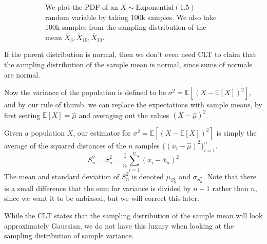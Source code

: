 \documentclass{article}
\begin{document}
\begin{example}
\begin{figure}[H]
\begin{subfigure}[b]{0.48\textwidth}
          \caption{We plot the PDF of an $X \sim \mathrm{Exponential}(1.5)$ random variable by taking 100k samples. We also take 100k samples from the sampling distribution of the mean $\overline{X}_{3}, \overline{X}_{10}, \overline{X}_{30}$. }
          \label{fig:sample_mean_exp}
        \end{subfigure}
        \caption{}
        \label{fig:sample_mean_examples}
      \end{figure}
    \end{example}

    If the parent distribution is normal, then we don't even need CLT to claim that the sampling distribution of the sample mean is normal, since sums of normals are normal. 

    Now the variance of the population is defined to be $\sigma^2 = \mathbb{E}[ (X - \mathbb{E}[X])^2 ]$, and by our rule of thumb, we can replace the expectations with sample means, by first setting $\mathbb{E}[X] = \widehat{\mu}$ and averaging out the values $(X - \widehat{\mu})^2$. 

    \begin{definition}
      Given a population $X$, our estimator for $\sigma^2 = \mathbb{E}[ (X - \mathbb{E}[X])^2 ]$ is simply the average of the squared distances of the $n$ samples $\{(x_i - \widehat{\mu})^2\}_{i=1}^n$. 
      \begin{equation}
        S^2_n = \widehat{\sigma}^2_n = \frac{1}{n} \sum_{i=1}^n ( x_i - \overline{x}_n)^2
      \end{equation}
      The mean and standard deviation of $S^2_n$ is denoted $\mu_{S^2_n}$ and $\sigma_{S^2_n}$. Note that there is a small difference that the sum for variance is divided by $n-1$ rather than $n$, since we want it to be unbiased, but we will correct this later. 
    \end{definition}

    While the CLT states that the sampling distribution of the sample mean will look approximately Gaussian, we do not have this luxury when looking at the sampling distribution of sample variance. 
\end{document}
